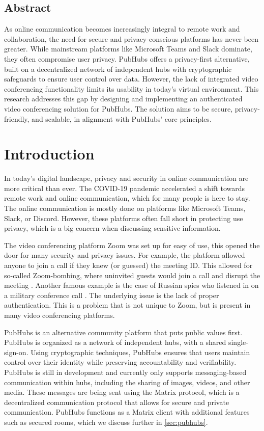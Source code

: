 \documentclass{report}
\begin{document}
\section*{Abstract}
As online communication becomes increasingly integral to remote work and collaboration, the need for secure and
privacy-conscious platforms has never been greater. While mainstream platforms like Microsoft Teams and Slack
dominate, they often compromise user privacy. PubHubs offers a  privacy-first alternative, built on a decentralized
network of independent hubs with cryptographic safeguards to ensure user control over data. However, the lack of
integrated video conferencing functionality limits its usability in today’s virtual environment. This research
addresses this gap by designing and implementing an authenticated video conferencing solution for PubHubs. The
solution aims to be secure, privacy-friendly, and scalable, in alignment with PubHubs’ core principles.


\tableofcontents
\chapter{Introduction}
In today's digital landscape, privacy and security in online communication are more critical than ever.
The COVID-19 pandemic accelerated a shift towards remote work and online communication, which for many people is here to stay.
The online communication is mostly done on platforms like Microsoft Teams, Slack, or Discord.
However, these platforms often fall short in protecting use privacy, which is a big concern when discussing sensitive
information.

The video conferencing platform Zoom was set up for easy of use, this opened the door for many security and privacy
issues. For example, the platform allowed anyone to join a call if they knew (or guessed) the meeting ID. This
allowed for so-called Zoom-bombing, where uninvited guests would join a call and disrupt the meeting \cite{ling_first_2021}.
Another famous example is the case of Russian spies who listened in on a military conference call \cite{
schmitz_germany_2024}. The underlying issue is the lack of proper authentication. This is a problem that is not
unique to Zoom, but is present in many video conferencing platforms.

PubHubs is an alternative community platform that puts public values first.
PubHubs is organized as a network of independent hubs, with a shared single-sign-on.
Using cryptographic techniques, PubHubs ensures that users maintain control over their identity while preserving
accountability and verifiability. PubHubs is still in development and currently only supports messaging-based
communication within hubs, including the sharing of images, videos, and other media. These messages are being
sent using the Matrix protocol, which is a decentralized communication protocol that allows for secure and private
communication. PubHubs functions as a Matrix client with additional features such as secured rooms, which we discuss
further in \autoref{sec:pubhubs}.
\end{document}
